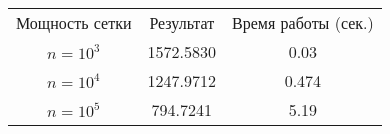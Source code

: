 	\begin{table}[ht]
	\begin{tabular}{|ccc}
		Мощность сетки & Результат  & Время работы (сек.) \\[5pt]
		$n=10^3$       & 1572.5830  & 0.03                \\
		$n=10^4$       & 1247.9712  & 0.474               \\
		$n=10^5$       & 794.7241   & 5.19                \\
	\end{tabular}
	\caption{}
	\label{tabRS}
	\end{table}